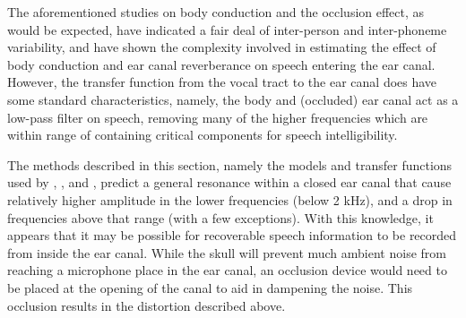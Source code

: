 \documentclass[dissertation,copyright]{uathesis}
\begin{document}
The aforementioned studies on body conduction and the occlusion effect, as would be expected, have indicated a fair deal of inter-person and inter-phoneme variability, and have shown the complexity involved in estimating the effect of body conduction and ear canal reverberance on speech entering the ear canal.  However, the transfer function from the vocal tract to the ear canal does have some standard characteristics, namely, the body and (occluded) ear canal act as a low-pass filter on speech, removing many of the higher frequencies which are within range of containing critical components for speech intelligibility.






The methods described in this section, namely the models and transfer functions used by \cite{hansen:97b}, \cite{stenfelt:07}, and \cite{reinfeldt:10}, predict a general resonance within a closed ear canal that cause relatively higher amplitude in the lower frequencies (below 2 kHz), and a drop in frequencies above that range (with a few exceptions).  With this knowledge, it appears that it may be possible for recoverable speech information to be recorded from inside the ear canal.  While the skull will prevent much ambient noise from reaching a microphone place in the ear canal, an occlusion device would need to be placed at the opening of the canal to aid in dampening the noise.  This occlusion results in the distortion described above.
\end{document}
